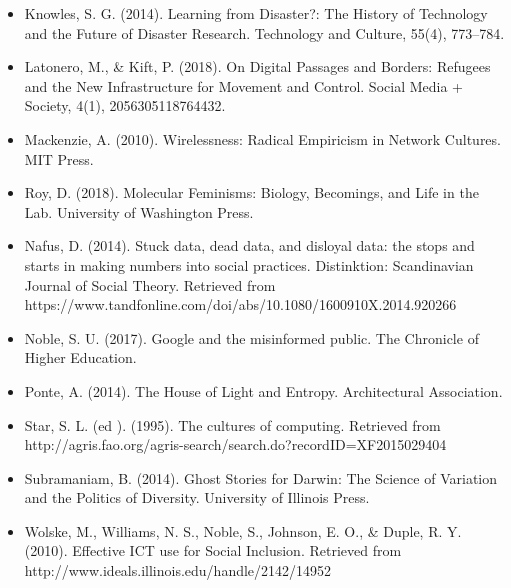 \documentclass[a4paper,man,natbib]{apa6}
\begin{document}
\begin{itemize}[label={},itemindent=-2em,leftmargin=2em]
   \item Knowles, S. G. (2014). Learning from Disaster?: The History of Technology and the Future of Disaster Research. Technology and Culture, 55(4), 773–784.

   \item Latonero, M., \& Kift, P. (2018). On Digital Passages and Borders: Refugees and the New Infrastructure for Movement and Control. Social Media + Society, 4(1), 2056305118764432.

   \item Mackenzie, A. (2010). Wirelessness: Radical Empiricism in Network Cultures. MIT Press.

   \item Roy, D. (2018). Molecular Feminisms: Biology, Becomings, and Life in the Lab. University of Washington Press.

   \item Nafus, D. (2014). Stuck data, dead data, and disloyal data: the stops and starts in making numbers into social practices. Distinktion: Scandinavian Journal of Social Theory. Retrieved from https://www.tandfonline.com/doi/abs/10.1080/1600910X.2014.920266

   \item Noble, S. U. (2017). Google and the misinformed public. The Chronicle of Higher Education.

   \item Ponte, A. (2014). The House of Light and Entropy. Architectural Association.

   \item Star, S. L. (ed ). (1995). The cultures of computing. Retrieved from http://agris.fao.org/agris-search/search.do?recordID=XF2015029404

   \item Subramaniam, B. (2014). Ghost Stories for Darwin: The Science of Variation and the Politics of Diversity. University of Illinois Press.

   \item Wolske, M., Williams, N. S., Noble, S., Johnson, E. O., \& Duple, R. Y. (2010). Effective ICT use for Social Inclusion. Retrieved from http://www.ideals.illinois.edu/handle/2142/14952

   \end{itemize}

   \setlength{\parindent}{4em}
   
\end{document}
